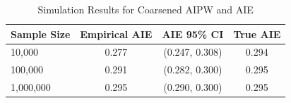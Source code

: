 \documentclass{article}
\begin{document}
\begin{table}[ht]
\centering
\caption{Simulation Results for Coarsened AIPW and AIE}
\begin{tabular}{lccc}
\toprule
Sample Size & Empirical AIE & AIE 95\% CI & True AIE \\
\midrule
10,000 & 0.277 & (0.247, 0.308) & 0.294 \\
100,000 & 0.291 & (0.282, 0.300) & 0.295 \\
1,000,000 & 0.295 & (0.290, 0.300) & 0.295 \\
\bottomrule
\end{tabular}
\end{table}
\end{document}
